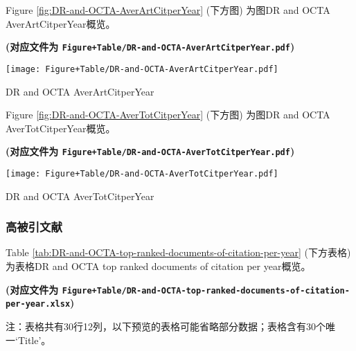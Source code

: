 \documentclass[
]{article}
\begin{document}
Figure \ref{fig:DR-and-OCTA-AverArtCitperYear} (下方图) 为图DR and OCTA AverArtCitperYear概览。

\textbf{(对应文件为 \texttt{Figure+Table/DR-and-OCTA-AverArtCitperYear.pdf})}

\def\@captype{figure}
\begin{center}
\texttt{[image: Figure+Table/DR-and-OCTA-AverArtCitperYear.pdf]}
\caption{DR and OCTA AverArtCitperYear}\label{fig:DR-and-OCTA-AverArtCitperYear}
\end{center}

Figure \ref{fig:DR-and-OCTA-AverTotCitperYear} (下方图) 为图DR and OCTA AverTotCitperYear概览。

\textbf{(对应文件为 \texttt{Figure+Table/DR-and-OCTA-AverTotCitperYear.pdf})}

\def\@captype{figure}
\begin{center}
\texttt{[image: Figure+Table/DR-and-OCTA-AverTotCitperYear.pdf]}
\caption{DR and OCTA AverTotCitperYear}\label{fig:DR-and-OCTA-AverTotCitperYear}
\end{center}

\hypertarget{ux9ad8ux88abux5f15ux6587ux732e}{%
\subsubsection{高被引文献}\label{ux9ad8ux88abux5f15ux6587ux732e}}

Table \ref{tab:DR-and-OCTA-top-ranked-documents-of-citation-per-year} (下方表格) 为表格DR and OCTA top ranked documents of citation per year概览。

\textbf{(对应文件为 \texttt{Figure+Table/DR-and-OCTA-top-ranked-documents-of-citation-per-year.xlsx})}

\begin{center}\begin{tcolorbox}[colback=gray!10, colframe=gray!50, width=0.9\linewidth, arc=1mm, boxrule=0.5pt]注：表格共有30行12列，以下预览的表格可能省略部分数据；表格含有30个唯一`Title'。
\end{tcolorbox}
\end{center}
\end{document}
